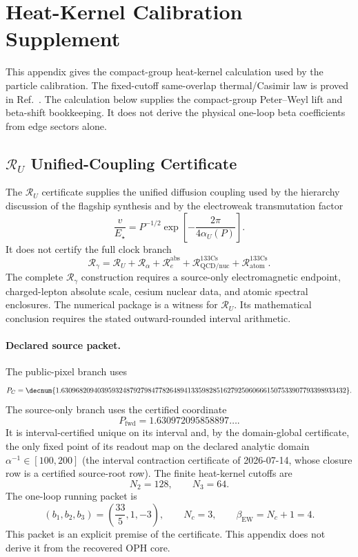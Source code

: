 \section{Heat-Kernel Calibration Supplement}
\label{app:particle-d10-heat-kernel}

This appendix gives the compact-group heat-kernel calculation used by the
particle calibration. The fixed-cutoff same-overlap thermal/Casimir law is
proved in Ref.~\cite{ophmicrophysics}. The calculation below supplies the
compact-group Peter--Weyl lift and beta-shift bookkeeping. It does not derive
the physical one-loop beta coefficients from edge sectors alone.

\subsection{\texorpdfstring{\(\mathcal R_U\)}{R\_U} Unified-Coupling Certificate}

The \(\mathcal R_U\) certificate supplies the unified diffusion coupling used
by the hierarchy discussion of the flagship synthesis and by the electroweak
transmutation factor
\[
\frac{v}{E_\star}
=
P^{-1/2}\exp\!\left[-\frac{2\pi}{4\alpha_U(P)}\right].
\]
It does not certify the full clock branch
\[
\mathcal R_\gamma
=
\mathcal R_U+\mathcal R_\alpha+\mathcal R_e^{\mathrm{abs}}
+\mathcal R_{\mathrm{QCD/nuc}}^{133\mathrm{Cs}}
+\mathcal R_{\mathrm{atom}}^{133\mathrm{Cs}}.
\]
The complete \(\mathcal R_\gamma\) construction requires a source-only electromagnetic endpoint,
charged-lepton absolute scale, cesium nuclear data, and atomic spectral
enclosures. The numerical package is a witness for \(\mathcal R_U\). Its
mathematical conclusion requires the stated outward-rounded interval
arithmetic.

\paragraph{Declared source packet.}
The public-pixel branch uses
\[
P_C
=
\decnum{1.6309682094039593248792798477826489413359828516279250606661507533907793398933432}.
\]
The source-only branch uses the certified coordinate
\[
P_{\mathrm{fwd}}
=
1.630972095858897\ldots.
\]
It is interval-certified unique on its interval and, by the domain-global certificate, the only fixed point of its
readout map on the declared analytic domain \(\alpha^{-1}\in[100,200]\)
(the interval contraction certificate of 2026-07-14, whose closure row is a
certified source-root row).
The finite heat-kernel cutoffs are
\[
N_2=128,\qquad N_3=64.
\]
The one-loop running packet is
\[
(b_1,b_2,b_3)=\left(\frac{33}{5},1,-3\right),
\qquad
N_c=3,
\qquad
\beta_{\mathrm{EW}}=N_c+1=4.
\]
This packet is an explicit premise of the certificate. This appendix does not
derive it from the recovered OPH core.

